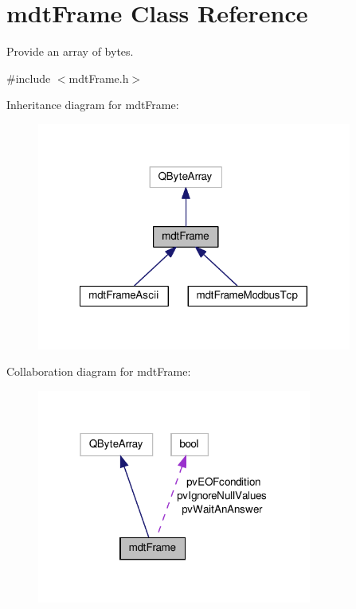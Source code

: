\hypertarget{classmdt_frame}{\section{mdt\-Frame Class Reference}
\label{classmdt_frame}
}


Provide an array of bytes.  




{\ttfamily \#include $<$mdt\-Frame.\-h$>$}



Inheritance diagram for mdt\-Frame\-:
\nopagebreak
\begin{figure}[H]
\begin{center}
\leavevmode
\includegraphics[width=293pt]{classmdt_frame__inherit__graph}
\end{center}
\end{figure}


Collaboration diagram for mdt\-Frame\-:\nopagebreak
\begin{figure}[H]
\begin{center}
\leavevmode
\includegraphics[width=256pt]{classmdt_frame__coll__graph}
\end{center}
\end{figure}
